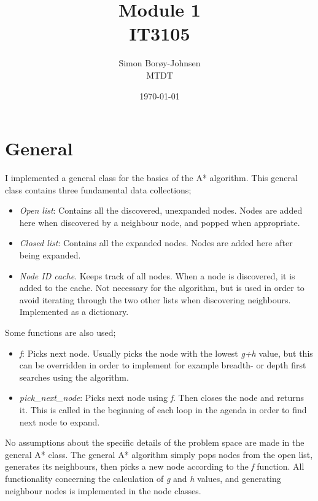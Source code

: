 \documentclass{article}
\begin{document}
\title{\textbf{Module 1} \\ IT3105}
\author{Simon Borøy-Johnsen \\ MTDT}
\date{\today}
\maketitle


\section*{General}
I implemented a general class for the basics of the A* algorithm. This general class contains three fundamental data collections;
\begin{itemize}
	\item \textit{Open list}: Contains all the discovered, unexpanded nodes. Nodes are added here when discovered by a neighbour node, and popped when appropriate.
	\item \textit{Closed list}: Contains all the expanded nodes. Nodes are added here after being expanded.
	\item \textit{Node ID cache}. Keeps track of all nodes. When a node is discovered, it is added to the cache. Not necessary for the algorithm, but is used in order to avoid iterating through the two other lists when discovering neighbours. Implemented as a dictionary.
\end{itemize}

Some functions are also used;
\begin{itemize}
	\item \textit{f}: Picks next node. Usually picks the node with the lowest \textit{g+h} value, but this can be overridden in order to implement for example breadth- or depth first searches using the algorithm.
	\item \textit{pick\_next\_node}: Picks next node using \textit{f}. Then closes the node and returns it. This is called in the beginning of each loop in the agenda in order to find next node to expand.
\end{itemize}

No assumptions about the specific details of the problem space are made in the general A* class. The general A* algorithm simply pops nodes from the open list, generates its neighbours, then picks a new node according to the \textit{f} function. All functionality concerning the calculation of \textit{g} and \textit{h} values, and generating neighbour nodes is implemented in the node classes.
\end{document}
